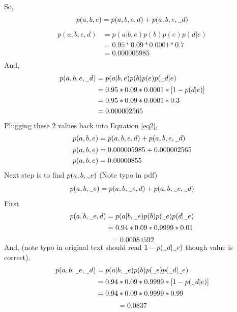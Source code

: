 \documentclass{article}
\newcommand{\midtilde}{\raisebox{-0.25\baselineskip}{\textasciitilde}}
\begin{document}
So,
\begin{equation}
    p(a,b,e) = p(a,b,e,d) + p(a,b,e,\midtilde d) \label{eq2}
\end{equation}
\begin{align*}
  p(a,b,e,d) & = p(a|b,e)p(b)p(e)p(d|e) \\
  & = 0.95*0.09*0.0001*0.7 \\
  & = 0.000005985 \\
\end{align*}
And,
\begin{align*}
  p(a,b,e,\midtilde d) & = p(a|b,e)p(b)p(e)p(\midtilde d|e) \\
  & = 0.95*0.09*0.0001*[1-p(d|e)] \\
  & = 0.95*0.09*0.0001*0.3 \\
  & = 0.000002565 \\
\end{align*}
Plugging these 2 values back into Equation \ref{eq2},
\begin{align*}
p(a,b,e) & = p(a,b,e,d) + p(a,b,e,\midtilde d) \\
p(a,b,e) & = 0.000005985 + 0.000002565 \\
p(a,b,e) & = 0.00000855 \\
\end{align*}
Next step is to find $p(a,b,\midtilde e)$ (Note typo in pdf)
\begin{equation}
    p(a,b,\midtilde e) = p(a,b,\midtilde e, d) + p(a,b,\midtilde e,\midtilde d) \label{eq3}
\end{equation}
First
\begin{align*}
    p(a,b,\midtilde e, d) & = p(a|b,\midtilde e)p(b)p(\midtilde e)p(d|\midtilde e) \\
    & = 0.94*0.09*0.9999*0.01 \\
\end{align*}
\begin{equation}
    = 0.00084592 \label{eq4}
\end{equation}
And, (note typo in original text should read $1 - p(\midtilde d|\midtilde e)$ though value is correct).
\begin{align*}
    p(a,b,\midtilde e, \midtilde d) & = p(a|b,\midtilde e)p(b)p(\midtilde e)p(\midtilde d|\midtilde e) \\
    & = 0.94*0.09*0.9999*[1-p(\midtilde d|e)] \\
    & = 0.94*0.09*0.9999*0.99 \\
\end{align*}
\begin{equation}
    = 0.0837 \label{eq5}
\end{equation}
\end{document}
